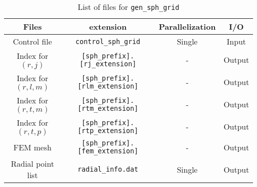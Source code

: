 %
\begin{table}[htp]
\caption{List of files for {\tt gen\_sph\_grid} }
\begin{center} 
\begin{tabular}{|c|c|c|c|}
\hline
Files & extension & Parallelization & I/O \\ \hline \hline
Control file & \verb|control_sph_grid| & Single & Input \\ \hline
Index for $(r,j)$ & \verb|[sph_prefix].[rj_extension]| & - & Output \\
Index for $(r,l,m)$ & \verb|[sph_prefix].[rlm_extension]| & - & Output \\
Index for $(r,t,m)$ & \verb|[sph_prefix].[rtm_extension]| & - & Output \\
Index for $(r,t,p)$ & \verb|[sph_prefix].[rtp_extension]| & - & Output \\ \hline
FEM mesh & \verb|[sph_prefix].[fem_extension]| & - & Output \\ \hline
Radial point list & \verb|radial_info.dat| & Single & Output \\ \hline
\end{tabular}
\end{center}
\label{table:gen_sph_grid}
\end{table}
%
%
